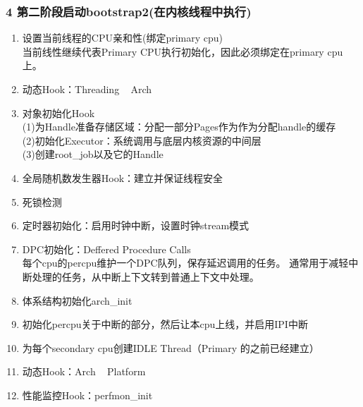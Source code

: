 \documentclass[
8pt, %
]{beamer}
\begin{document}
	\begin{frame}
		\frametitle{4 第二阶段启动bootstrap2(在内核线程中执行)}
		\begin{enumerate}
			\item 设置当前线程的CPU亲和性(绑定primary cpu)\\
			当前线性继续代表Primary CPU执行初始化，因此必须绑定在primary cpu上。
			\item 动态Hook：Threading ~ Arch
			\item 对象初始化Hook\\
			(1)为Handle准备存储区域：分配一部分Pages作为作为分配handle的缓存\\
			(2)初始化Executor：系统调用与底层内核资源的中间层\\
			(3)创建root\_job以及它的Handle
			\item 全局随机数发生器Hook：建立并保证线程安全
			\item 死锁检测
			\item 定时器初始化：启用时钟中断，设置时钟stream模式
			\item DPC初始化：Deffered Procedure Calls\\
			每个cpu的percpu维护一个DPC队列，保存延迟调用的任务。
			通常用于减轻中断处理的任务，从中断上下文转到普通上下文中处理。
			\item 体系结构初始化arch\_init
			\item 初始化percpu关于中断的部分，然后让本cpu上线，并启用IPI中断
			\item 为每个secondary cpu创建IDLE Thread（Primary 的之前已经建立）
			\item 动态Hook：Arch ~ Platform
			\item 性能监控Hook：perfmon\_init
		\end{enumerate}
	\end{frame}
\end{document}
